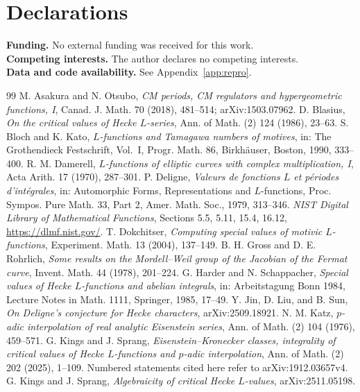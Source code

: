 \documentclass[11pt]{amsart}
\theoremstyle{remark}
\theoremstyle{definition}
\begin{document}
\section*{Declarations}
\noindent\textbf{Funding.} No external funding was received for this work.\\
\textbf{Competing interests.} The author declares no competing interests.\\
\textbf{Data and code availability.} See Appendix~\ref{app:repro}.

\begin{thebibliography}{99}
 M. Asakura and N. Otsubo, \emph{CM periods, CM regulators and hypergeometric functions, I}, Canad. J. Math. 70 (2018), 481--514; arXiv:1503.07962.
 D. Blasius, \emph{On the critical values of Hecke $L$-series}, Ann. of Math. (2) 124 (1986), 23--63.
 S. Bloch and K. Kato, \emph{$L$-functions and Tamagawa numbers of motives}, in: The Grothendieck Festschrift, Vol.~I, Progr. Math. 86, Birkh\"auser, Boston, 1990, 333--400.
 R. M. Damerell, \emph{$L$-functions of elliptic curves with complex multiplication, I}, Acta Arith. 17 (1970), 287--301.
 P. Deligne, \emph{Valeurs de fonctions $L$ et p\'eriodes d'int\'egrales}, in: Automorphic Forms, Representations and $L$-functions, Proc. Sympos. Pure Math. 33, Part 2, Amer. Math. Soc., 1979, 313--346.
 \emph{NIST Digital Library of Mathematical Functions}, Sections 5.5, 5.11, 15.4, 16.12, \url{https://dlmf.nist.gov/}.
 T. Dokchitser, \emph{Computing special values of motivic $L$-functions}, Experiment. Math. 13 (2004), 137--149.
 B. H. Gross and D. E. Rohrlich, \emph{Some results on the Mordell--Weil group of the Jacobian of the Fermat curve}, Invent. Math. 44 (1978), 201--224.
 G. Harder and N. Schappacher, \emph{Special values of Hecke $L$-functions and abelian integrals}, in: Arbeitstagung Bonn 1984, Lecture Notes in Math. 1111, Springer, 1985, 17--49.
 Y. Jin, D. Liu, and B. Sun, \emph{On Deligne's conjecture for Hecke characters}, arXiv:2509.18921.
 N. M. Katz, \emph{$p$-adic interpolation of real analytic Eisenstein series}, Ann. of Math. (2) 104 (1976), 459--571.
 G. Kings and J. Sprang, \emph{Eisenstein--Kronecker classes, integrality of critical values of Hecke $L$-functions and $p$-adic interpolation}, Ann. of Math. (2) 202 (2025), 1--109. Numbered statements cited here refer to arXiv:1912.03657v4.
 G. Kings and J. Sprang, \emph{Algebraicity of critical Hecke $L$-values}, arXiv:2511.05198.

\end{thebibliography}
\end{document}

